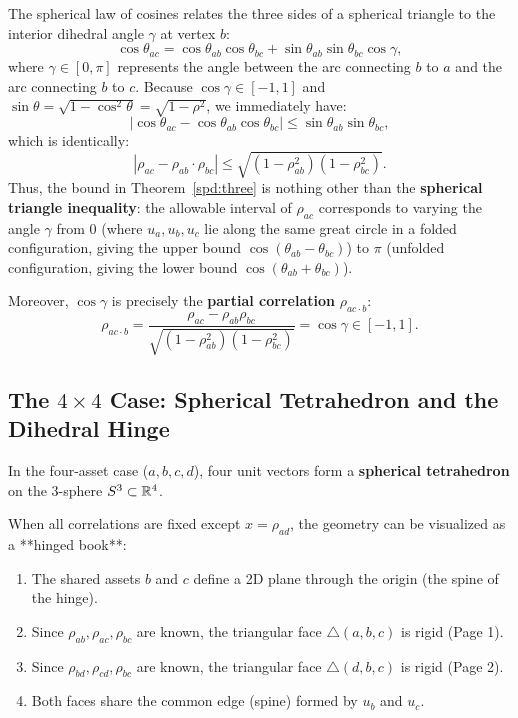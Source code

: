 \documentclass[a4paper]{article}
\begin{document}
The spherical law of cosines relates the three sides of a spherical triangle to the interior dihedral angle $\gamma$ at vertex $b$:
\begin{equation}
\cos \theta_{ac} = \cos \theta_{ab} \cos \theta_{bc} + \sin \theta_{ab} \sin \theta_{bc} \cos \gamma,
\end{equation}
where $\gamma \in [0, \pi]$ represents the angle between the arc connecting $b$ to $a$ and the arc connecting $b$ to $c$. Because $\cos \gamma \in [-1, 1]$ and $\sin \theta = \sqrt{1 - \cos^2 \theta} = \sqrt{1 - \rho^2}$, we immediately have:
\begin{equation}
\left| \cos \theta_{ac} - \cos \theta_{ab} \cos \theta_{bc} \right| \leq \sin \theta_{ab} \sin \theta_{bc},
\end{equation}
which is identically:
\begin{equation}
\left| \rho_{ac} - \rho_{ab} \cdot \rho_{bc} \right| \leq \sqrt{(1 - \rho_{ab}^2)(1 - \rho_{bc}^2)}.
\end{equation}
Thus, the bound in Theorem~\ref{spd:three} is nothing other than the \textbf{spherical triangle inequality}: the allowable interval of $\rho_{ac}$ corresponds to varying the angle $\gamma$ from $0$ (where $u_a, u_b, u_c$ lie along the same great circle in a folded configuration, giving the upper bound $\cos(\theta_{ab} - \theta_{bc})$) to $\pi$ (unfolded configuration, giving the lower bound $\cos(\theta_{ab} + \theta_{bc})$).

Moreover, $\cos \gamma$ is precisely the \textbf{partial correlation} $\rho_{ac \cdot b}$:
\begin{equation}
\rho_{ac \cdot b} = \frac{\rho_{ac} - \rho_{ab}\rho_{bc}}{\sqrt{(1 - \rho_{ab}^2)(1 - \rho_{bc}^2)}} = \cos \gamma \in [-1, 1].
\end{equation}

\subsection{The \texorpdfstring{$4 \times 4$}{4x4} Case: Spherical Tetrahedron and the Dihedral Hinge}
In the four-asset case ($a, b, c, d$), four unit vectors form a \textbf{spherical tetrahedron} on the 3-sphere $S^3 \subset \mathbb{R}^4$. 

When all correlations are fixed except $x = \rho_{ad}$, the geometry can be visualized as a **hinged book**:
\begin{enumerate}[leftmargin=*]
\item The shared assets $b$ and $c$ define a 2D plane through the origin (the spine of the hinge).
\item Since $\rho_{ab}, \rho_{ac}, \rho_{bc}$ are known, the triangular face $\triangle(a, b, c)$ is rigid (Page 1).
\item Since $\rho_{bd}, \rho_{cd}, \rho_{bc}$ are known, the triangular face $\triangle(d, b, c)$ is rigid (Page 2).
\item Both faces share the common edge (spine) formed by $u_b$ and $u_c$.
\end{enumerate}
\end{document}
